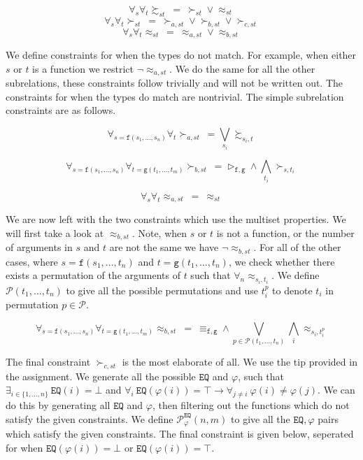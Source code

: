 \documentclass{scrartcl}
\begin{document}
$$\forall_s \forall_t \succsim_{st}\ =\ \succ_{st} \lor \approx_{st}$$
$$\forall_s \forall_t \succ_{st}\ =\ \succ_{a,st} \lor \succ_{b,st} \lor \succ_{c,st}$$
$$\forall_s \forall_t \approx_{st}\ =\ \approx_{a,st} \lor \approx_{b,st}$$

We define constraints for when the types do not match. For example, when
either $s$ or $t$ is a function we restrict $\neg\approx_{a,st}$. We do the
same for all the other subrelations, these constraints follow trivially and
will not be written out. The constraints for when the types do match are
nontrivial. The simple subrelation constraints are as follows.

$$\forall_{s = \mathtt{f}(s_1, \dots, s_n)} \forall_t \succ_{a,st}\ =
\bigvee_{s_i} \succsim_{s_i,t}$$

$$\forall_{s = \mathtt{f}(s_1, \dots, s_n)} \forall_{t = \mathtt{g}(t_1, \dots,
t_m)} \succ_{b,st}\ = \rhd_{\mathtt{f,g}} \land \bigwedge_{t_i} \succ_{s,t_i}$$

$$\forall_s \forall_t \approx_{a,st}\ =\ \approx_{st}$$

We are now left with the two constraints which use the multiset properties. We
will first take a look at $\approx_{b,st}$. Note, when $s$ or $t$ is not a
function, or the number of arguments in $s$ and $t$ are not the same we have
$\neg \approx_{b,st}$. For all of the other cases, where $s=\mathtt{f}(s_1,
\dots, t_n)$ and $t=\mathtt{g}(t_1, \dots, t_n)$, we check whether there exists
a permutation of the arguments of $t$ such that $\forall_n \approx_{s_i,t_i}$.
We define $\mathcal{P}(t_1, \dots, t_n)$ to give all the possible permutations
and use $t^p_i$ to denote $t_i$ in permutation $p \in \mathcal{P}$.

$$\forall_{s = \mathtt{f}(s_1, \dots, s_n)} \forall_{t = \mathtt{g}(t_1, \dots,
t_m)} \approx_{b,st}\ =\ \equiv_{\mathtt{f,g}} \land \bigvee_{p \in
\mathcal{P}(t_1, \dots, t_n)} \bigwedge_i \approx_{s_i,t^p_i}$$

The final constraint $\succ_{c,st}$ is the most elaborate of all. We use the
tip provided in the assignment. We generate all the possible $\mathtt{EQ}$ and
$\varphi$, such that $\exists_{i \in \{1, \dots, n\}}\ \mathtt{EQ}(i) = \bot$
and $\forall_i\ \mathtt{EQ}(\varphi(i)) = \top \to \forall_{j \neq i}\
\varphi(i) \neq \varphi(j)$. We can do this by generating all $\mathtt{EQ}$ and
$\varphi$, then filtering out the functions which do not satisfy the given
constraints. We define $\mathcal{P}^\mathtt{EQ}_\varphi(n, m)$ to give all the
$\mathtt{EQ}, \varphi$ pairs which satisfy the given constraints. The final
constraint is given below, seperated for when $\mathtt{EQ}(\varphi(i)) = \bot$
or $\mathtt{EQ}(\varphi(i)) = \top$.
\end{document}
